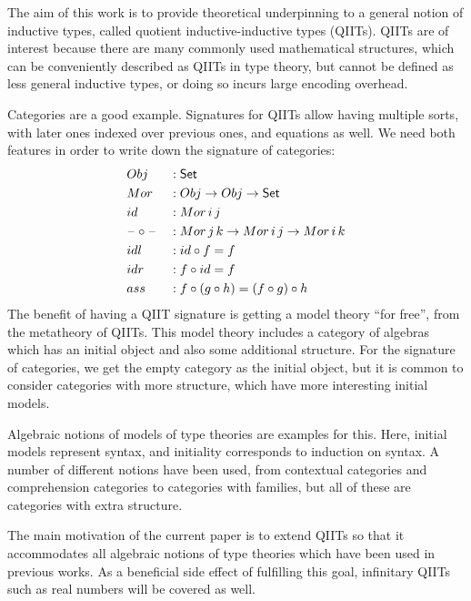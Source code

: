 \documentclass{llncs}
\begin{document}

The aim of this work is to provide theoretical underpinning to a general notion
of inductive types, called quotient inductive-inductive types (QIITs). QIITs are
of interest because there are many commonly used mathematical structures, which
can be conveniently described as QIITs in type theory, but cannot be defined as
less general inductive types, or doing so incurs large encoding overhead.

Categories are a good example. Signatures for QIITs allow having multiple sorts,
with later ones indexed over previous ones, and equations as well. We need both
features in order to write down the signature of categories:
\begin{alignat*}{5}
  & Obj && : \mathsf{Set} \\
  & Mor && : Obj \rightarrow Obj \rightarrow \mathsf{Set} \\
  & id  && : Mor\,i\,j \\
  & \mathord{\hspace{1pt}\text{--}\hspace{1pt}}\circ\mathord{\hspace{1pt}\text{--}\hspace{1pt}} && : Mor\,j\,k\rightarrow Mor\,i\,j \rightarrow Mor\,i\,k \\
  & idl && : id \circ f = f \\
  & idr && : f \circ id = f \\
  & ass && : f \circ (g \circ h) = (f \circ g) \circ h
\end{alignat*}
The benefit of having a QIIT signature is getting a model theory ``for free'',
from the metatheory of QIITs. This model theory includes a category of algebras
which has an initial object and also some additional structure. For the
signature of categories, we get the empty category as the initial object, but it
is common to consider categories with more structure, which have more
interesting initial models.

Algebraic notions of models of type theories are examples for this. Here,
initial models represent syntax, and initiality corresponds to induction on
syntax. A number of different notions have been used, from contextual categories
and comprehension categories to categories with families, but all of these are
categories with extra structure.

The main motivation of the current paper is to extend QIITs so that it
accommodates all algebraic notions of type theories which have been used in
previous works. As a beneficial side effect of fulfilling this goal, infinitary
QIITs such as real numbers will be covered as well.
\end{document}
